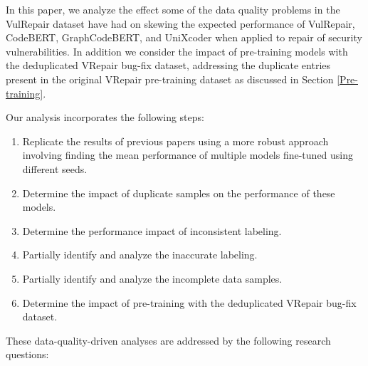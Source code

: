 In this paper, we analyze the effect some of the data quality problems in the VulRepair dataset have had on skewing the expected performance of VulRepair, CodeBERT, GraphCodeBERT, and UniXcoder when applied to repair of security vulnerabilities.
In addition we consider the impact of pre-training models with the deduplicated VRepair bug-fix dataset, addressing the duplicate entries present in the original VRepair pre-training dataset as discussed in Section \ref{Pre-training}.

Our analysis incorporates the following steps:
\begin{enumerate}
    \item Replicate the results of previous papers using a more robust approach involving finding the mean performance of multiple models fine-tuned using different seeds.
    \item Determine the impact of duplicate samples on the performance of these models.
    \item Determine the performance impact of inconsistent labeling.
    \item Partially identify and analyze the inaccurate labeling.
    \item Partially identify and analyze the incomplete data samples.
    \item Determine the impact of pre-training with the deduplicated VRepair bug-fix dataset. 
\end{enumerate}

These data-quality-driven analyses are addressed by the following research questions:


